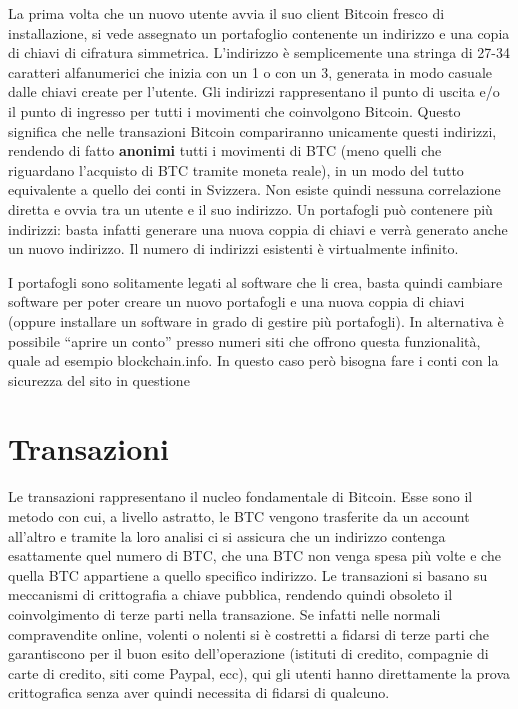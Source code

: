 La prima volta che un nuovo utente avvia il suo client Bitcoin fresco di installazione, si vede assegnato un portafoglio contenente un indirizzo e una copia di chiavi di cifratura simmetrica. L'indirizzo è semplicemente una stringa di 27-34 caratteri alfanumerici che inizia con un 1 o con un 3, generata in modo casuale dalle chiavi create per l'utente. Gli indirizzi rappresentano il punto di uscita e/o il punto di ingresso per tutti i movimenti che coinvolgono Bitcoin. Questo significa che nelle transazioni Bitcoin compariranno unicamente questi indirizzi, rendendo di fatto \textbf{anonimi} tutti i movimenti di BTC (meno quelli che riguardano l'acquisto di BTC tramite moneta reale), in un modo del tutto equivalente a quello dei conti in Svizzera. Non esiste quindi nessuna correlazione diretta e ovvia tra un utente e il suo indirizzo. Un portafogli può contenere più indirizzi: basta infatti generare una nuova coppia di chiavi e verrà generato anche un nuovo indirizzo. Il numero di indirizzi esistenti è virtualmente infinito.

I portafogli sono solitamente legati al software che li crea, basta quindi cambiare software per poter creare un nuovo portafogli e una nuova coppia di chiavi (oppure installare un software in grado di gestire più portafogli). In alternativa è possibile ``aprire un conto'' presso numeri siti che offrono questa funzionalità, quale ad esempio blockchain.info. In questo caso però bisogna fare i conti con la sicurezza del sito in questione

\section{Transazioni}\label{transazioni}

Le transazioni rappresentano il nucleo fondamentale di Bitcoin. Esse sono il metodo con cui, a livello astratto, le BTC vengono trasferite da un account all'altro e tramite la loro analisi ci si assicura che un indirizzo contenga esattamente quel numero di BTC, che una BTC non venga spesa più volte e che quella BTC appartiene a quello specifico indirizzo. Le transazioni si basano su meccanismi di crittografia a chiave pubblica, rendendo quindi obsoleto il coinvolgimento di terze parti nella transazione. Se infatti nelle normali compravendite online, volenti o nolenti si è costretti a fidarsi di terze parti che garantiscono per il buon esito dell'operazione (istituti di credito, compagnie di carte di credito, siti come Paypal, ecc), qui gli utenti hanno direttamente la prova crittografica senza aver quindi necessita di fidarsi di qualcuno.


